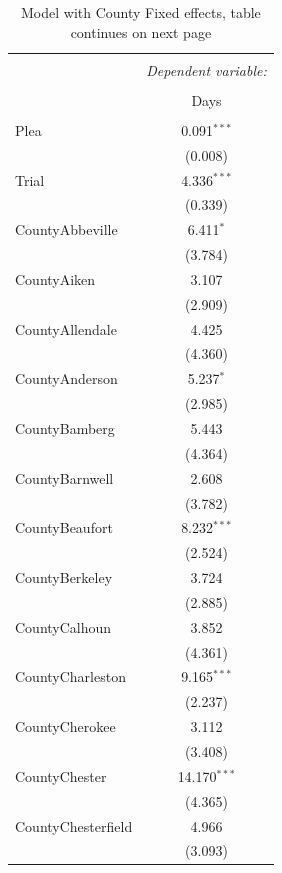\documentclass[11pt]{article}
\begin{document}
  \begin{table}[H] \centering
    \caption{Model with County Fixed effects, table continues on next page}
    \small
    \begin{tabular}{@{\extracolsep{5pt}}lc}
    \\[-1.8ex]\hline
    \hline \\[-1.8ex]
     & \multicolumn{1}{c}{\textit{Dependent variable:}} \\
    \cline{2-2}
    \\[-1.8ex] & Days \\
    \hline \\[-1.8ex]
    Plea & 0.091$^{***}$ \\
     & (0.008) \\
     Trial & 4.336$^{***}$ \\
     & (0.339) \\
     CountyAbbeville & 6.411$^{*}$ \\
     & (3.784) \\
     CountyAiken & 3.107 \\
     & (2.909) \\
     CountyAllendale & 4.425 \\
     & (4.360) \\
     CountyAnderson & 5.237$^{*}$ \\
     & (2.985) \\
     CountyBamberg & 5.443 \\
     & (4.364) \\
     CountyBarnwell & 2.608 \\
     & (3.782) \\
     CountyBeaufort & 8.232$^{***}$ \\
     & (2.524) \\
     CountyBerkeley & 3.724 \\
     & (2.885) \\
     CountyCalhoun & 3.852 \\
     & (4.361) \\
     CountyCharleston & 9.165$^{***}$ \\
     & (2.237) \\
     CountyCherokee & 3.112 \\
     & (3.408) \\
     CountyChester & 14.170$^{***}$ \\
     & (4.365) \\
     CountyChesterfield & 4.966 \\
     & (3.093) \\

\end{tabular}
\end{table}
\end{document}

